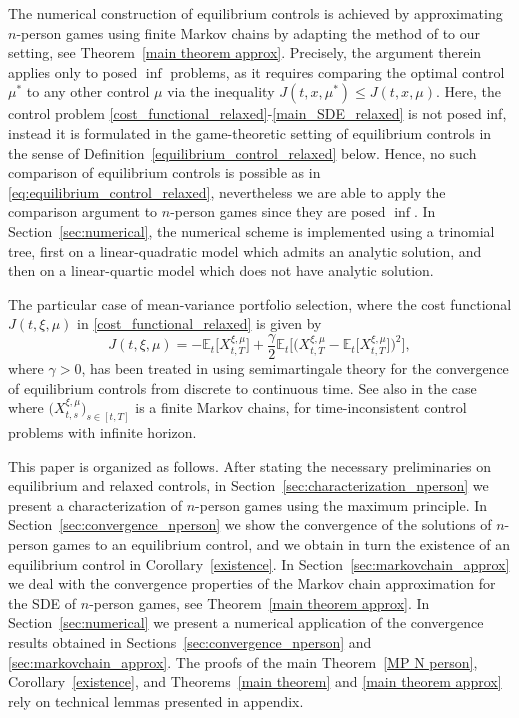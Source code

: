 \documentclass[12pt]{article}
\theoremstyle{named}
\numberwithin{equation}{section}
\let\oldcitet=\citet
\renewcommand{\cite}[1]{\textcolor[rgb]{0,0,1}{\oldcitet{#1}}}
\renewcommand{\citet}[1]{\textcolor[rgb]{0,0,1}{\oldcitet{#1}}}
\begin{document}
The numerical construction of
equilibrium controls
is achieved by approximating ${n}$-person games using finite Markov chains
by adapting the method of \cite{kushner1990numerical} to our setting,
see Theorem~\ref{main theorem approx}.
Precisely, the argument therein
 applies only to posed $\inf$ problems, as it requires
    comparing
the optimal control $\mu^*$ to any other control $\mu$
 via the inequality $J (t,x,\mu^* ) \leq J(t,x,\mu)$.
Here, the control problem \eqref{cost_functional_relaxed}-\eqref{main_SDE_relaxed}
is not posed inf, instead it is
formulated in the game-theoretic setting of equilibrium controls
in the sense of Definition~\ref{equilibrium_control_relaxed}
below.
 Hence, no such comparison of equilibrium controls
 is possible
 as in \eqref{eq:equilibrium_control_relaxed},
 nevertheless we are able to apply the comparison argument
 to ${n}$-person games since they are posed $\inf$.
 In Section~\ref{sec:numerical},
 the numerical scheme is implemented using a trinomial tree,
 first on a linear-quadratic model which admits an analytic solution,
 and then on a linear-quartic model which does not have analytic solution.

\medskip
The particular case of mean-variance portfolio selection,
where the cost functional
$J(t,\xi,\mu)$ in \eqref{cost_functional_relaxed}
is given by
$$
   J(t,\xi,\mu) =
 - \mathbb{E}_t \big[ X^{\xi,\mu}_{t,T}\big]
 +
 \frac{\gamma}{2}
 \mathbb{E}_t \big[ \big( X^{\xi,\mu}_{t,T} -  \mathbb{E}_t \big[ X^{\xi,\mu}_{t,T}\big]\big)^2 \big],
$$
 where $\gamma >0$,
 has been treated in \cite{czichowsky2013time}
using semimartingale theory
for the convergence of equilibrium controls  from discrete to continuous time.
See also \cite{huang2018strong}
 in the case where $\big(X^{\xi,\mu}_{t,s} \big)_{s\in [t,T]}$
 is a finite Markov chains,
 for time-inconsistent control problems
 with infinite horizon.

\medskip

This paper is organized as follows. After stating the necessary
 preliminaries on equilibrium and
relaxed controls,
 in Section~\ref{sec:characterization_nperson} we present a characterization of ${n}$-person games
using the maximum principle.
In Section~\ref{sec:convergence_nperson} we show the convergence of the solutions of ${n}$-person games to an equilibrium control, and we obtain in turn the existence of an equilibrium control in Corollary~\ref{existence}.
In Section~\ref{sec:markovchain_approx} we
 deal with the convergence properties of the Markov chain approximation
 for the SDE of ${n}$-person games,
 see Theorem~\ref{main theorem approx}.
In Section~\ref{sec:numerical} we present a numerical application of
 the convergence results obtained in Sections~\ref{sec:convergence_nperson} and \ref{sec:markovchain_approx}.
The proofs of the main Theorem~\ref{MP N person},
Corollary~\ref{existence}, and Theorems~\ref{main theorem}
 and \ref{main theorem approx} rely on technical lemmas presented in appendix.
\end{document}
